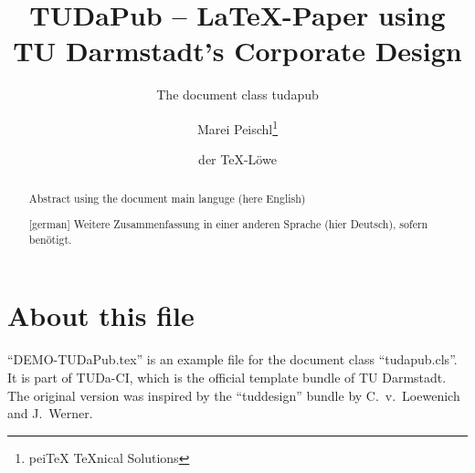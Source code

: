 \documentclass[
	english,%
	accentcolor=9c,%
]{tudapub}
\title{TUDaPub -- \LaTeX-Paper using TU Darmstadt's Corporate Design}
\subtitle{The document class tudapub}
\author{Marei Peischl\thanks{pei\TeX{} \TeX{}nical Solutions}\and der \TeX-Löwe}
\begin{document}
\maketitle

\begin{abstract}
	Abstract using the document main languge (here English)
\end{abstract}

\begin{abstract}[german]
	Weitere Zusammenfassung in einer anderen Sprache (hier Deutsch), sofern benötigt.
\end{abstract}

\tableofcontents


\section{About this file}

\enquote{DEMO-TUDaPub.tex} is an example file for the document class \enquote{tudapub.cls}.
It is part of TUDa-CI, which is the official template bundle of TU Darmstadt. The original version was inspired by the \enquote{tuddesign} bundle by C.~v.~Loewenich and J.~Werner.


\printbibliography
\end{document}
